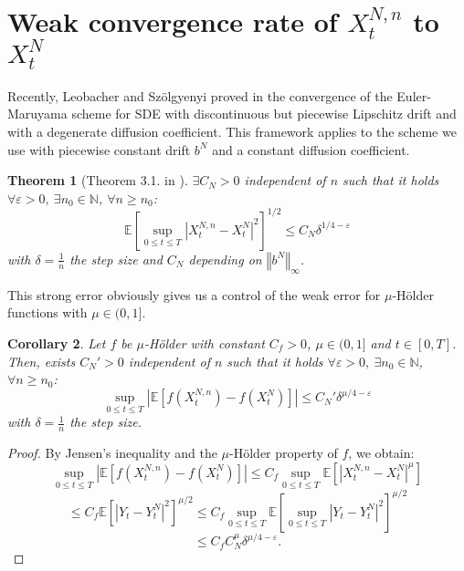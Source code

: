 \documentclass[11pt]{enstaPRE}
\newtheorem{theo}{Theorem}
\newtheorem{cor}[theo]{Corollary}
\newcommand{\norme}[1]{\left\Vert #1\right\Vert}
\newcommand{\N}{\mathbb{N}}
\newcommand{\E}{\mathbb{E}}
\begin{document}
\section{Weak convergence rate of $X_t^{N,n}$ to $X_t^N$}
\paragraph{}
Recently, Leobacher and Szölgyenyi proved in \cite{Leo-Szo} the convergence of the Euler-Maruyama scheme for SDE with discontinuous but piecewise Lipschitz drift and with a degenerate diffusion coefficient. This framework applies to the scheme we use with piecewise constant drift $b^N$ and a constant diffusion coefficient.

\begin{theo}[Theorem 3.1. in \cite{Leo-Szo}]\label{leo}
    $\exists C_N>0$ independent of $n$ such that it holds  $\forall \varepsilon >0,\ \exists n_0\in\N$, $\forall n\geq n_0$:
    \begin{equation}
    \E\left[\underset{0\leq t\leq T}{\sup}\left|X^{N,n}_t-X^N_t\right|^2\right]^{1/2}\leq C_N\delta^{1/4-\varepsilon}
    \end{equation}
    with $\delta=\frac{1}{n}$ the step size and $C_N$ depending on $\norme{b^N}_\infty$.
\end{theo}

This strong error obviously gives us a control of the weak error for $\mu$-Hölder functions with $\mu\in(0,1]$.

\begin{cor}
    Let $f$ be $\mu$-Hölder with constant $C_f>0$, $\mu\in(0,1]$ and $t\in[0,T]$. Then, exists $C_N'>0$ independent of $n$ such that it holds  $\forall \varepsilon >0,\ \exists n_0\in\N$, $\forall n\geq n_0$:
    \begin{equation}
    \underset{0\leq t\leq T}{\sup}\left|\E\left[f\left(X_t^{N,n}\right)-f\left(X_t^N\right)\right]\right| \leq C_N'\delta^{\mu/4-\varepsilon}
    \end{equation}                       
    with $\delta=\frac{1}{n}$ the step size.
\end{cor}

\begin{proof}
    By Jensen's inequality and the $\mu$-Hölder property of $f$, we obtain:
    \begin{equation*}
    \underset{0\leq t\leq T}{\sup}\left|\E\left[f\left(X_t^{N,n}\right)-f\left(X_t^N\right)\right]\right| \leq C_f \underset{0\leq t\leq T}{\sup} \E\left[\left|X_t^{N,n}-X_t^N\right|^\mu\right]
    \end{equation*}
    \begin{equation*}
    \leq  C_f  \E\left[\left|Y_t-Y_t^N\right|^2\right]^{\mu/2} \leq  C_f  \underset{0\leq t\leq T}{\sup}\E\left[\underset{0\leq t\leq T}{\sup}\left|Y_t-Y_t^N\right|^2\right]^{\mu/2}
    \end{equation*}
    \begin{equation*}
    \leq C_f  C_N^\mu\delta^{\mu/4-\varepsilon}.
    \end{equation*}
\end{proof}
\end{document}
